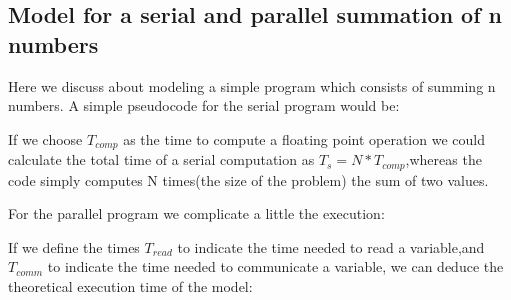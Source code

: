 \documentclass[11pt]{scrartcl} %
\begin{document}
\subsection{Model for a serial and parallel summation of n numbers}
Here we discuss about modeling a simple program which consists of summing n numbers.
A simple pseudocode for the serial program would be:


\begin{algorithmic}

  \ENDFOR
{}
\end{algorithmic}

If we choose $T_{comp}$ as the time to compute a floating point operation we could calculate the total time of a serial computation as
$T_s = N * T_{comp}$,whereas the code simply computes N times(the size of the problem) the sum of two values.

For the parallel program we complicate a little the execution:

\begin{algorithmic}


		  \ENDFOR
		  \ENDFOR
\ENDIF
{}
	  \ENDFOR
\ENDIF
{}
\end{algorithmic}

If we define the times $T_{read}$ to indicate the time needed to read a variable,and $T_{comm}$ to indicate the time needed to communicate a variable, we can deduce the theoretical execution time of the model:
\  
\begin{algorithmic}
\end{algorithmic}
\ 
\begin{algorithmic}
\end{algorithmic}
\ 
\end{document}
